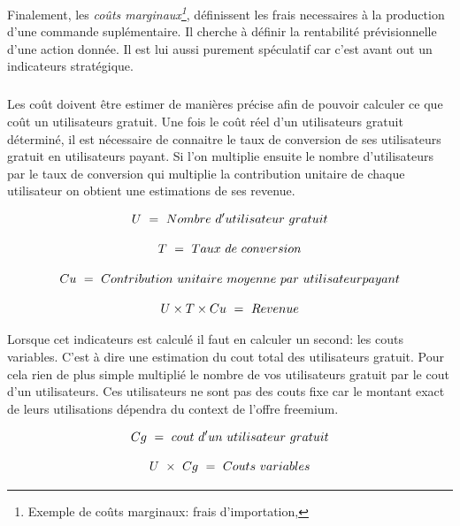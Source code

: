 \documentclass[11pt, a4paper ]{article}
\begin{document}
\begin{spacing}{1.5}
Finalement, les \emph{coûts marginaux\footnote{Exemple de coûts marginaux: frais d'importation, }}, définissent les frais necessaires à la production d'une commande suplémentaire. Il cherche à définir la rentabilité prévisionnelle d'une action donnée. Il est lui aussi purement spéculatif car c'est avant out un indicateurs stratégique.
\subparagraph{}
Les coût doivent être estimer de manières précise afin de pouvoir calculer ce que coût un utilisateurs gratuit. Une fois le coût réel d'un utilisateurs gratuit déterminé, il est nécessaire de connaitre le taux de conversion de ses utilisateurs gratuit en utilisateurs payant. Si l'on multiplie ensuite le nombre d'utilisateurs par le taux de conversion qui multiplie la contribution unitaire de chaque utilisateur on obtient une estimations de ses revenue\cite{equationFreemium}.

\begin{equation}\index{U!définition}
	U\ =\ Nombre\ d'utilisateur\ gratuit
\end{equation}


\begin{equation}\index{T!définition}
	T\ =\ Taux\ de\ conversion
\end{equation}


\begin{equation} \index{Cu!définition}
	Cu\ =\ Contribution\ unitaire\ moyenne\ par\ utilisateur payant
\end{equation}


\begin{equation}\index{Revenue!définition}
	U \times T \times Cu\ =\ Revenue
\end{equation}

Lorsque cet indicateurs est calculé il faut en calculer un second: les couts variables. C'est à dire une estimation du cout total des utilisateurs gratuit. Pour cela rien de plus simple multiplié le nombre de vos utilisateurs gratuit par le cout d'un utilisateurs. Ces utilisateurs ne sont pas des couts fixe car le montant exact de leurs utilisations dépendra du context de l'offre freemium.

\begin{equation}\index{Cg!définition}
	Cg\ =\ cout\ d'un\ utilisateur\ gratuit
\end{equation}


\begin{equation}\index{Couts variables!calcule}
	U\ \times\ Cg\ =\ Couts\ variables
\end{equation}


\end{spacing}
\end{document}
